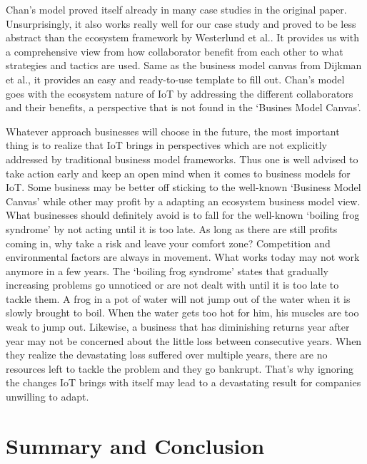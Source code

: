		Chan's model proved itself already in many case studies in the original paper. Unsurprisingly, it also works really well for our case study and proved to be less abstract than the ecosystem framework by Westerlund et al.. It provides us with a comprehensive view from how collaborator benefit from each other to what strategies and tactics are used. Same as the business model canvas from Dijkman et al., it provides an easy and ready-to-use template to fill out. Chan's model goes with the ecosystem nature of IoT by addressing the different collaborators and their benefits, a perspective that is not found in the `Busines Model Canvas'.

		Whatever approach businesses will choose in the future, the most important thing is to realize that IoT brings in perspectives which are not explicitly addressed by traditional business model frameworks. Thus one is well advised to take action early and keep an open mind when it comes to business models for IoT. Some business may be better off sticking to the well-known `Business Model Canvas' while other may profit by a adapting an ecosystem business model view. What businesses should definitely avoid is to fall for the well-known `boiling frog syndrome' by not acting until it is too late. As long as there are still profits coming in, why take a risk and leave your comfort zone? Competition and environmental factors are always in movement. What works today may not work anymore in a few years. The `boiling frog syndrome' states that gradually increasing problems go unnoticed or are not dealt with until it is too late to tackle them. A frog in a pot of water will not jump out of the water when it is slowly brought to boil. When the water gets too hot for him, his muscles are too weak to jump out. Likewise, a business that has diminishing returns year after year may not be concerned about the little loss between consecutive years. When they realize the devastating loss suffered over multiple years, there are no resources left to tackle the problem and they go bankrupt. That's why ignoring the changes IoT brings with itself may lead to a devastating result for companies unwilling to adapt.

\section{Summary and Conclusion}
\label{sec:summary}

